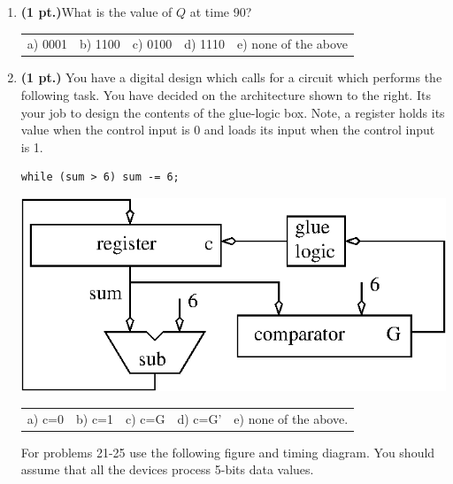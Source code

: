 \documentclass{article}
\begin{document}
\begin{enumerate}
\item {\bf (1 pt.)}What is the value of $Q$ at time 90?

\begin{tabular}{p{0.6in} p{0.6in} p{0.6in} p{0.6in} l}
a) 0001 & b) 1100 & c) 0100 & d) 1110 & e) none of the above
\end{tabular}

\item {\bf (1 pt.)} You have a digital design which calls for a circuit
which performs the following task.  You have decided on the architecture
shown to the right.  Its your job to design the contents of the glue-logic
box. Note, a register holds its value when the control input is 0 and 
loads its input when the control input is 1.

\begin{verbatim}
while (sum > 6) sum -= 6;
\end{verbatim}

\includegraphics{./Fig2/while6}

\begin{tabular}{p{0.6in} p{0.6in} p{0.6in} p{0.6in} l}
a) c=0 & b) c=1 & c) c=G & d) c=G' & e) none of the above.  
\end{tabular}

\pagebreak
For problems 21-25 use the following figure and timing diagram.
You should assume that all the devices process 5-bits data 
values.


\end{enumerate}
\end{document}
